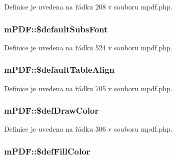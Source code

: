 Definice je uvedena na řádku 208 v souboru mpdf.\-php.

\hypertarget{classm_p_d_f_a3859d89513c50bfe6ef9ef035ea4a390}{
\subsubsection[{\$default\-Subs\-Font}]{\setlength{\rightskip}{0pt plus 5cm}m\-P\-D\-F\-::\$default\-Subs\-Font}}\label{classm_p_d_f_a3859d89513c50bfe6ef9ef035ea4a390}


Definice je uvedena na řádku 524 v souboru mpdf.\-php.

\hypertarget{classm_p_d_f_a64c32a13df3e9124bb0d78226e5fce35}{
\subsubsection[{\$default\-Table\-Align}]{\setlength{\rightskip}{0pt plus 5cm}m\-P\-D\-F\-::\$default\-Table\-Align}}\label{classm_p_d_f_a64c32a13df3e9124bb0d78226e5fce35}


Definice je uvedena na řádku 705 v souboru mpdf.\-php.

\hypertarget{classm_p_d_f_ae689c89f825d2e00977cad05f5708f4c}{
\subsubsection[{\$def\-Draw\-Color}]{\setlength{\rightskip}{0pt plus 5cm}m\-P\-D\-F\-::\$def\-Draw\-Color}}\label{classm_p_d_f_ae689c89f825d2e00977cad05f5708f4c}


Definice je uvedena na řádku 306 v souboru mpdf.\-php.

\hypertarget{classm_p_d_f_a3add912a90adf5c26da623acca404a0d}{
\subsubsection[{\$def\-Fill\-Color}]{\setlength{\rightskip}{0pt plus 5cm}m\-P\-D\-F\-::\$def\-Fill\-Color}}\label{classm_p_d_f_a3add912a90adf5c26da623acca404a0d}


